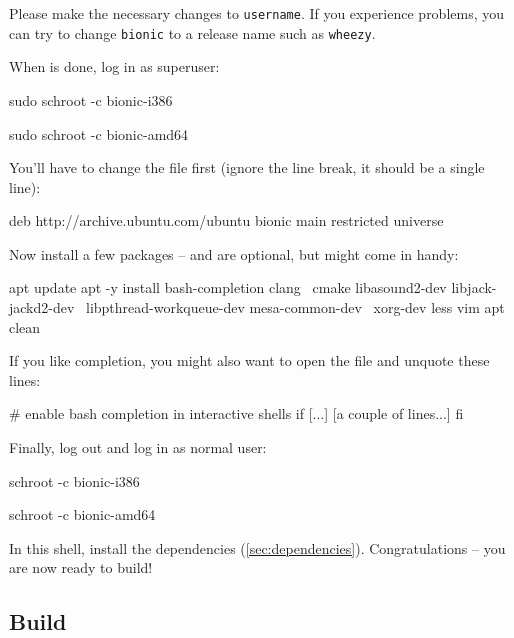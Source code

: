 Please make the necessary changes to \texttt{username}.  If you
experience problems, you can try to change \texttt{bionic} to a
release name such as \texttt{wheezy}.

When  is done, log in as superuser:

\begin{Verbatim32}
  sudo schroot -c bionic-i386
\end{Verbatim32}

\begin{Verbatim64}
  sudo schroot -c bionic-amd64
\end{Verbatim64}

You'll have to change the file  first
(ignore the line break, it should be a single line):

\begin{VerbatimBoth}
  deb http://archive.ubuntu.com/ubuntu bionic
  main restricted universe
\end{VerbatimBoth}

Now install a few packages --  and  are optional,
but might come in handy:

\begin{VerbatimBoth}
  apt update
  apt -y install bash-completion clang \
    cmake libasound2-dev libjack-jackd2-dev \
    libpthread-workqueue-dev mesa-common-dev \
    xorg-dev less vim
  apt clean
\end{VerbatimBoth}

If you like  completion, you might also want to open the
file  and unquote these lines:

\begin{VerbatimBoth}
  # enable bash completion in interactive shells
  if [...]
    [a couple of lines...]
  fi
\end{VerbatimBoth}

Finally, log out and log in as normal user:

\begin{Verbatim32}
  schroot -c bionic-i386
\end{Verbatim32}

\begin{Verbatim64}
  schroot -c bionic-amd64
\end{Verbatim64}

In this  shell, install the dependencies
(\ref{sec:dependencies}).  Congratulations -- you are now ready to
build!

\subsection{Build}

